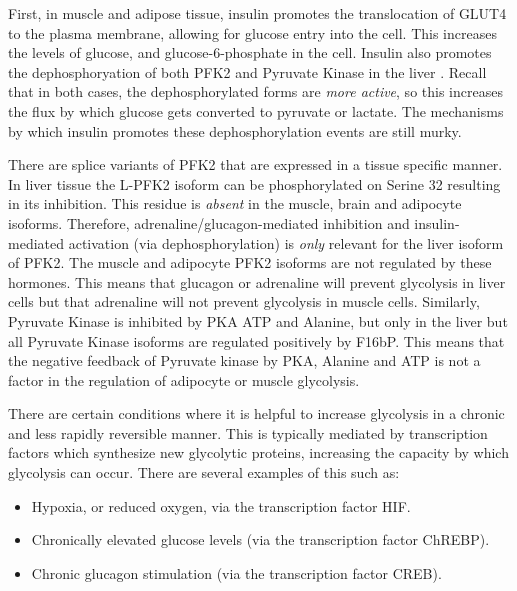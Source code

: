 \documentclass{tufte-handout}
\begin{document}
  First, in muscle and adipose tissue, insulin promotes the translocation of GLUT4 to the plasma membrane, allowing for glucose entry into the cell.  This increases the levels of glucose, and glucose-6-phosphate in the cell.  Insulin also promotes the dephosphoryation of both PFK2 and Pyruvate Kinase in the liver \citep{PROBST1985}. Recall that in both cases, the dephosphorylated forms are \emph{more active}, so this increases the flux by which glucose gets converted to pyruvate or lactate.  The mechanisms by which insulin promotes these dephosphorylation events are still murky.

  There are splice variants of PFK2 that are expressed in a tissue specific manner.  In liver tissue the L-PFK2 isoform can be phosphorylated on Serine 32 resulting in its inhibition.  This residue is \emph{absent} in the muscle, brain and adipocyte isoforms.  Therefore, adrenaline/glucagon-mediated inhibition and insulin-mediated activation (via dephosphorylation) is \emph{only} relevant for the liver isoform of PFK2.  The muscle and adipocyte PFK2 isoforms are not regulated by these hormones.  This means that glucagon or adrenaline will prevent glycolysis in liver cells but that adrenaline will not prevent glycolysis in muscle cells.  Similarly, Pyruvate Kinase is inhibited by PKA ATP and Alanine, but only in the liver but all Pyruvate Kinase isoforms are regulated positively by F16bP.  This means that the negative feedback of Pyruvate kinase by PKA, Alanine and ATP is not a factor in the regulation of adipocyte or muscle glycolysis.  

  There are certain conditions where it is helpful to increase glycolysis in a chronic and less rapidly reversible manner.  This is typically mediated by transcription factors which synthesize new glycolytic proteins, increasing the capacity by which glycolysis can occur.  There are several examples of this such as:

\begin{itemize}
\item Hypoxia, or reduced oxygen, via the transcription factor HIF.
\item Chronically elevated glucose levels (via the transcription factor ChREBP).    
\item Chronic glucagon stimulation (via the transcription factor CREB).
\end{itemize}
\end{document}
